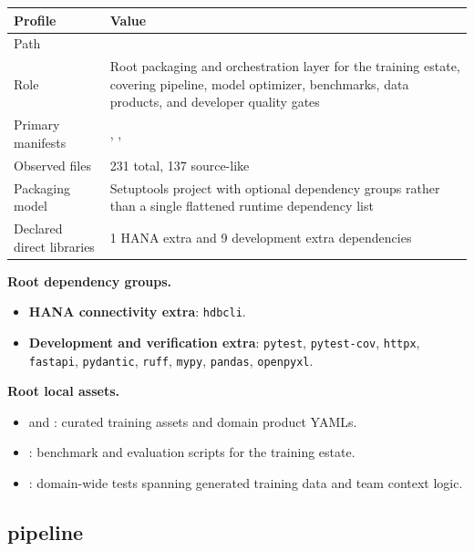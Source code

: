 \documentclass[11pt,a4paper]{article}
\begin{document}
\begin{tabular}{@{}P{4.2cm}P{9.8cm}@{}}
\toprule
\textbf{Profile} & \textbf{Value} \\
\midrule
Path &  \\
Role & Root packaging and orchestration layer for the training estate, covering pipeline, model optimizer, benchmarks, data products, and developer quality gates \\
Primary manifests & , ,  \\
Observed files & 231 total, 137 source-like \\
Packaging model & Setuptools project with optional dependency groups rather than a single flattened runtime dependency list \\
Declared direct libraries & 1 HANA extra and 9 development extra dependencies \\
\bottomrule
\end{tabular}

\textbf{Root dependency groups.}
\begin{itemize}[leftmargin=*]
    \item \textbf{HANA connectivity extra}: \texttt{hdbcli}.
    \item \textbf{Development and verification extra}: \texttt{pytest}, \texttt{pytest-cov}, \texttt{httpx}, \texttt{fastapi}, \texttt{pydantic}, \texttt{ruff}, \texttt{mypy}, \texttt{pandas}, \texttt{openpyxl}.
\end{itemize}

\textbf{Root local assets.}
\begin{itemize}[leftmargin=*]
    \item {} and : curated training assets and domain product YAMLs.
    \item {}: benchmark and evaluation scripts for the training estate.
    \item {}: domain-wide tests spanning generated training data and team context logic.
\end{itemize}

\subsection{pipeline}
\end{document}
